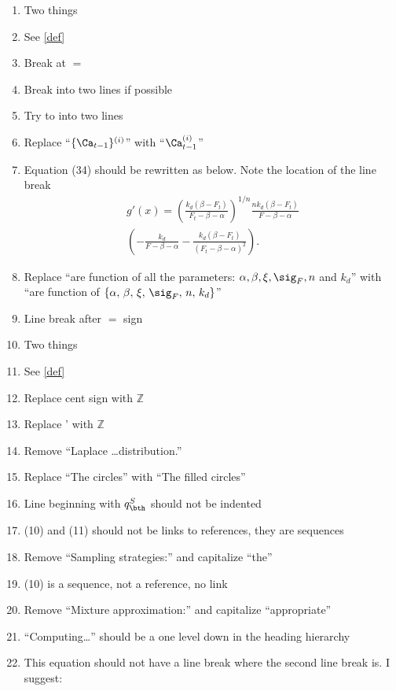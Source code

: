 \begin{enumerate}

\item Two things
\ita 
\item See \ref{def}
\item Break at $=$
\itb
\item Break into two lines if possible
\item Try to into two lines
\item Replace ``$\{\Ca_{t-1}\}^{(i)}$'' with ``$\Ca_{t-1}^{(i)}$''
\item Equation (34) should be rewritten as below.  Note the location of the line break
\begin{multline*}
g'(x) = \left(\frac{k_d (\beta -F_t)}{F_t - \beta - \alpha}\right)^{1/n}  \frac{n k_d (\beta - F_t)}{F-\beta-\alpha} \\ 
\left(-\frac{k_d}{F-\beta-\alpha}-\frac{k_d(\beta-F_t)}{(F_t-\beta-\alpha)^2}\right).
\end{multline*}
\item Replace ``are function of all the parameters: $\alpha, \beta, \xi, \sig_F, n$ and $k_d$'' with ``are function of $\{\alpha, \, \beta, \, \xi, \, \sig_F, \, n, \, k_d\}$''
\item Line break after $=$ sign
\item Two things
\ita \item See \ref{def} \item Replace cent sign with $\mathbb{Z}$ \itb
\item Replace ' with $\mathbb{Z}$
\item Remove ``Laplace \ldots distribution.''
\item Replace ``The circles'' with ``The filled circles''
\item Line beginning with $q_{\bth}^S$ should not be indented
\item (10) and (11) should not be links to references, they are sequences
\item Remove ``Sampling strategies:'' and capitalize ``the'' 
\item (10) is a sequence, not a reference, no link
\item Remove ``Mixture approximation:'' and capitalize ``appropriate''
\item ``Computing\ldots'' should be a one level down in the heading hierarchy
\item This equation should not have a line break where the second line break is.  I suggest:
\begin{multline*} 

\end{multline*}
\end{enumerate}
